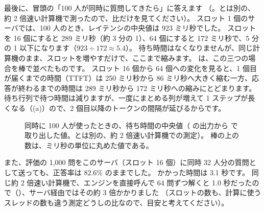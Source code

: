 最後に、冒頭の「100 人が同時に質問してきたら」に答えます
（。とは別の、約 2 倍速い計算機で測ったので、比だけを見てください）。
スロット 1 個のサーバでは、100 人のとき、レイテンシの中央値は 923 ミリ秒でした。
スロットを 16 個にすると 289 ミリ秒（約 3 分の 1）、64 個にすると 172 ミリ秒で、5 分の 1 以下になります（$923\div172\approx5.4$）。
待ち時間はなくなりませんが、同じ計算機のまま、スロットを増やすだけで、ここまで縮みます。
は、この三つの場合を棒で並べたものです。
スロット 16 個から 64 個への変化を見ると、1 個目が届くまでの時間（TTFT）は 250 ミリ秒から 86 ミリ秒へ大きく縮む一方、応答が終わるまでの時間は 289 ミリ秒から 172 ミリ秒への縮みにとどまります。
待ち行列で待つ時間は減りますが、一度にまとめる列が増えて 1 ステップが長くなる（(a)）ので、2 個目以降のトークンの間隔が延びるからです。

\begin{figure}[tbp]
\centering
{}
\caption{同時に 100 人が使ったときの、待ち時間の中央値（ の出力から  で取り出した値。とは別の、約 2 倍速い計算機での測定）。
棒の上の数は、ミリ秒の単位に丸めた値である。}
\label{fig:es-load100}
\end{figure}

また、評価の 1,000 問をこのサーバ（スロット 16 個）に同時 32 人分の質問として送っても、正答率は 82.6\% のままでした。
かかった時間は 3.1 秒です。
同じ約 2 倍速い計算機で、エンジンを直接呼んで 64 問ずつ解くと 1.0 秒だったので（）、サーバ経由ではその約 3 倍かかりました
（スロットの数も、計算に使うスレッドの数も違う測定どうしの比なので、目安と考えてください）。

